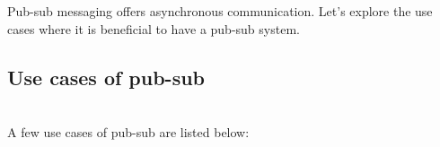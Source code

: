 

Pub-sub messaging offers asynchronous communication. Let's explore the use cases where it is beneficial to have a pub-sub system.

\subsection{Use cases of pub-sub}\label{PIoWmcakwydMwkUWhwQHm}
\\
A few use cases of pub-sub are listed below:

